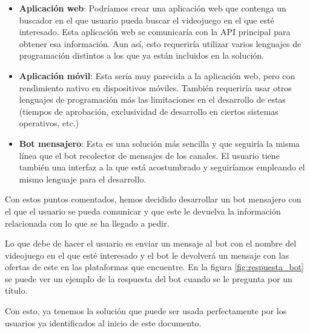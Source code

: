 \begin{itemize}
    \item \textbf{Aplicación web}: Podríamos crear una aplicación web que contenga 
    un buscador en el que usuario pueda buscar el videojuego en el que esté 
    interesado. Esta aplicación web se comunicaría con la API principal para 
    obtener esa información. Aun así, esto requeriría utilizar varios lenguajes de 
    programación distintos a los que ya están incluidos en la solución.
    \item \textbf{Aplicación móvil}: Esta sería muy parecida a la aplicación web, 
    pero con rendimiento nativo en dispositivos móviles. También requeriría 
    usar otros lenguajes de programación más las limitaciones en el desarrollo de 
    estas (tiempos de aprobación, exclusividad de desarrollo en ciertos sistemas 
    operativos, etc.)
    \item \textbf{Bot mensajero}: Esta es una solución más sencilla y que seguiría 
    la misma línea que el bot recolector de mensajes de los canales. El usuario 
    tiene también una interfaz a la que está acostumbrado y seguiríamos empleando 
    el mismo lenguaje para el desarrollo.
\end{itemize}

Con estos puntos comentados, hemos decidido desarrollar un bot mensajero con el que 
el usuario se pueda comunicar y que este le devuelva la información relacionada con 
lo que se ha llegado a pedir.

Lo que debe de hacer el usuario es enviar un mensaje al bot con el nombre del 
videojuego en el que esté interesado y el bot le devolverá un mensaje con las 
ofertas de este en las plataformas que encuentre. En la figura 
\ref{fig:respuesta_bot} se puede ver un ejemplo de la respuesta del bot cuando se 
le pregunta por un título.

Con esto, ya tenemos la solución que puede ser usada perfectamente por los usuarios 
ya identificados al inicio de este documento.
